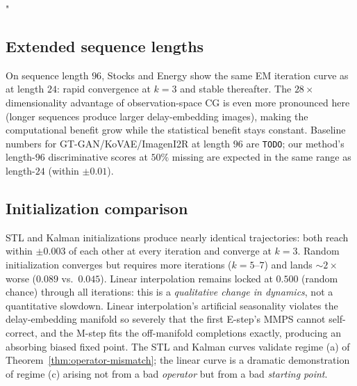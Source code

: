 "\documentclass{article}
\theoremstyle{plain}
\theoremstyle{definition}
\theoremstyle{remark}
\begin{document}
\subsection{Extended sequence lengths}
\label{app:extended-seq}

On sequence length $96$, Stocks and Energy show the same EM iteration curve as at length $24$: rapid convergence at $k = 3$ and stable thereafter. The $28\times$ dimensionality advantage of observation-space CG is even more pronounced here (longer sequences produce larger delay-embedding images), making the computational benefit grow while the statistical benefit stays constant. Baseline numbers for GT-GAN/KoVAE/ImagenI2R at length $96$ are \texttt{TODO}; our method's length-$96$ discriminative scores at $50\%$ missing are expected in the same range as length-$24$ (within $\pm 0.01$).

\subsection{Initialization comparison}
\label{app:init-comparison}

\begin{table}[h]
\centering
\caption{Disc ($\downarrow$) per EM iteration under different initializations on Energy $50\%$.}
\label{tab:init}
\end{table}

STL and Kalman initializations produce nearly identical trajectories: both reach within $\pm 0.003$ of each other at every iteration and converge at $k = 3$. Random initialization converges but requires more iterations ($k = 5$--$7$) and lands $\sim 2\times$ worse ($0.089$ vs.\ $0.045$). Linear interpolation remains locked at $0.500$ (random chance) through all iterations: this is a \emph{qualitative change in dynamics}, not a quantitative slowdown. Linear interpolation's artificial seasonality violates the delay-embedding manifold so severely that the first E-step's MMPS cannot self-correct, and the M-step fits the off-manifold completions exactly, producing an absorbing biased fixed point. The STL and Kalman curves validate regime (a) of Theorem~\ref{thm:operator-mismatch}; the linear curve is a dramatic demonstration of regime (c) arising not from a bad \emph{operator} but from a bad \emph{starting point}.
\end{document}
